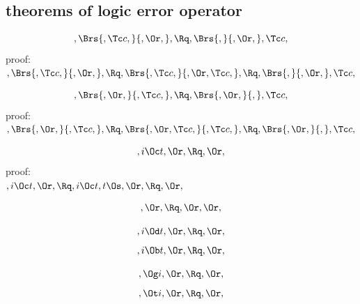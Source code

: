 \subsection{theorems of logic error operator}



\[, \Brs{,\Tc c,}{,\Or,} , \Rq , \Brs{,}{,\Or,},\Tc c, \]
\bigskip
proof:\\
\begin{math} 
 ,\Brs{,\Tc c,}{,\Or,} ,\\\\
\Rq ,\Brs{,\Tc c,}{,\Or,\Tc c,} , \\\\
\Rq ,\Brs{,}{,\Or,} ,\Tc c,
\end{math}
\bigskip



\[, \Brs{,\Or,}{,\Tc c,}, \Rq , \Brs{,\Or,}{,},\Tc c, \]
proof:\\
\begin{math} 
,\Brs{,\Or,}{,\Tc c,},
\Rq ,\Brs{,\Or,\Tc c,}{,\Tc c,} , \\\\
\Rq ,\Brs{,\Or,}{,},\Tc c,
\end{math}
\bigskip

\[,i \Oc t, \Or, \Rq ,\Or,\]
\bigskip
proof:\\
\begin{math} 
,i \Oc t, \Or,\\\\
\Rq ,i \Oc t,  t \Os, \Or, \\\\
\Rq ,\Or,
\end{math}
\bigskip

\[, \Or, \Rq , \Or, \Or,\]

\[,i \Od t, \Or, \Rq ,\Or,\]
\[,i \Ob t, \Or, \Rq ,\Or,\]

\[, \Og i, \Or, \Rq ,\Or,\]
\[, \Ot i, \Or, \Rq ,\Or,\]



\newpage


